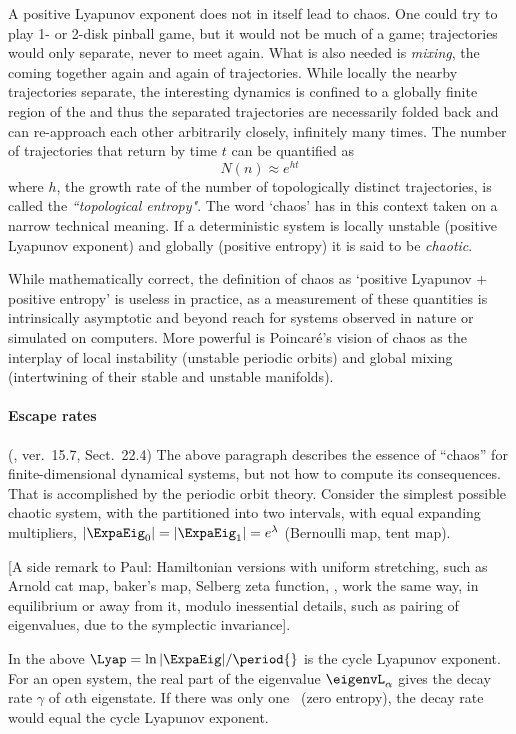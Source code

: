 \begin{description}
{A positive Lyapunov exponent does not in itself lead to chaos. One
could try to play 1- or 2-disk pinball game, but it would not be much
of a game; trajectories would only separate, never to meet again. What
is also needed is {\em mixing}, the coming together
again and again of trajectories.  While locally the nearby
trajectories separate, the interesting dynamics is confined to a
globally finite region of the {\statesp} and thus the
separated trajectories are necessarily
folded back and can re-approach each other
arbitrarily closely, infinitely many times.
The number of
trajectories that return by time $t$ can be quantified as
\[
    N(n) \approx e^{h t}
\]
where $h$, the growth rate of the
number of topologically distinct trajectories,
is called the {\em ``topological entropy"}.
The word
`chaos' has in this context taken on a narrow technical meaning.  If
a deterministic system is locally unstable (positive Lyapunov
exponent) and globally
 (positive {entropy}) it is said
to be {\em chaotic}.

While mathematically correct, the definition of chaos as `positive
Lyapunov + positive entropy' is useless in practice, as a measurement
of these quantities is intrinsically asymptotic and beyond reach for
systems observed in nature or simulated on computers.
More powerful is Poincar\'e's vision
of chaos as
the interplay of local instability (unstable periodic orbits)
and global mixing (intertwining of their stable and unstable
manifolds).

\paragraph{Escape rates}
(\wwwcb{}, ver.~15.7, Sect.~22.4)
The above paragraph describes the essence of ``chaos'' for
finite-dimensional dynamical systems, but not how to compute its
consequences. That is accomplished by the periodic orbit theory.
Consider the simplest possible chaotic system, with the {\statesp}
partitioned into two intervals, with equal expanding multipliers,
$|\ExpaEig_0| = |\ExpaEig_1| = e^\lambda  $ (Bernoulli map, tent map).

[A side remark to Paul: Hamiltonian versions with uniform stretching,
such as Arnold cat map, baker's map, Selberg zeta function, \etc, work
the same way, in equilibrium or away from it, modulo inessential details,
such as pairing of eigenvalues, due to the symplectic invariance].

In the above $\Lyap = \ln |\ExpaEig| /\period{}$ is the cycle Lyapunov
exponent. For an open system, the real part of the eigenvalue
$\eigenvL_\alpha$ gives the decay rate $\gamma$ of $\alpha$th eigenstate. If there was
only one \po\ (zero entropy),  the decay rate would  equal the cycle
Lyapunov exponent.

}
\end{description}

